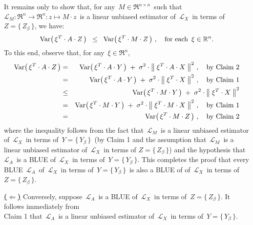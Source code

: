 \begin{enumerate}
	\vskip 0.1cm
	It remains only to show that, for any \,$M \in \Re^{n \times n}$\, such that
	\,$\mathcal{L}_{M} : \Re^{n} \longrightarrow \Re^{n} : z \longmapsto M \cdot z$\,
	is a linear unbiased estimator of
	\,$\mathcal{L}_{X}$\, in terms of \,$Z = \{\,Z_{\beta}\,\}$,
	we have:
	\begin{equation*}
	\textnormal{Var}\!\left(\,\xi^{T} \cdot A \cdot Z\,\right)
	\;\; \leq \;\;
		\textnormal{Var}\!\left(\,\xi^{T} \cdot M \cdot Z\,\right)\,,
	\quad
	\textnormal{for each \,$\xi \in \mathbb{R}^{n}$}.
	\end{equation*}
	To this end, observe that, for any \,$\xi \in \Re^{n}$,
	\begin{eqnarray*}
	\textnormal{Var}\!\left(\,\xi^{T} \cdot A \cdot Z\,\right)
	& = &
		\textnormal{Var}\!\left(\,\xi^{T} \cdot A \cdot Y\,\right)
		\; + \;
		\sigma^{2} \cdot \left\Vert\; \xi^{T} \cdot A \cdot X \;\right\Vert^{2}\,,
		\quad\textnormal{by Claim 2}
	\\
	& = &
		\textnormal{Var}\!\left(\,\xi^{T} \cdot A \cdot Y\,\right)
		\; + \;
		\sigma^{2} \cdot \left\Vert\; \xi^{T} \cdot X \;\right\Vert^{2}\,,
		\quad\textnormal{by Claim 1}
	\\
	& \leq &
		\textnormal{Var}\!\left(\,\xi^{T} \cdot M \cdot Y\,\right)
		\; + \;
		\sigma^{2} \cdot \left\Vert\; \xi^{T} \cdot X \;\right\Vert^{2}
	\\
	& = &
		\textnormal{Var}\!\left(\,\xi^{T} \cdot M \cdot Y\,\right)
		\; + \;
		\sigma^{2} \cdot \left\Vert\; \xi^{T} \cdot M \cdot X \;\right\Vert^{2}\,,
		\quad\textnormal{by Claim 1}
	\\
	& = &
		\textnormal{Var}\!\left(\,\xi^{T} \cdot M \cdot Z\,\right)\,,
		\quad\textnormal{by Claim 2}
	\end{eqnarray*}
	where the inequality follows from the fact that
	\,$\mathcal{L}_{M}$\, is a linear unbiased estimator of
	\,$\mathcal{L}_{X}$\, in terms of \,$Y = \{\,Y_{\beta}\,\}$\,
	(by Claim 1 and the assumption that \,$\mathcal{L}_{M}$\,
	is a linear unbiased estimator of \,$\mathcal{L}_{X}$\,
	in terms of $Z = \{\,Z_{\beta}\,\}$)
	and the hypothesis that
	\,$\mathcal{L}_{A}$\, is a BLUE of \,$\mathcal{L}_{X}$\,
	in terms of \,$Y = \{\,Y_{\beta}\,\}$.
	This completes the proof that every BLUE \,$\mathcal{L}_{A}$\,
	of \,$\mathcal{L}_{X}$\, in terms of \,$Y = \{\,Y_{\beta}\,\}$\,
	is also a BLUE of
	of \,$\mathcal{L}_{X}$\, in terms of \,$Z = \{\,Z_{\beta}\,\}$.
	
	\vskip 0.5cm
	\noindent
	\underline{\textbf{(\;$\Longleftarrow$\;)}}\quad
	Conversely, suppose \,$\mathcal{L}_{A}$\, is a BLUE of \,$\mathcal{L}_{X}$\, in terms of \,$Z = \{\,Z_{\beta}\,\}$.
	It follows immediately from\\ Claim 1 that
	\,$\mathcal{L}_{A}$\, is a linear unbiased estimator of
	\,$\mathcal{L}_{X}$\, in terms of \,$Y = \{\,Y_{\beta}\,\}$.
	

\end{enumerate}
